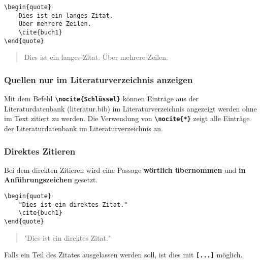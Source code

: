 \begin{minipage}[c]{0.48\textwidth}
    \begin{lstlisting}[language={[LaTeX]TeX}]
\begin{quote}
    Dies ist ein langes Zitat. 
    Uber mehrere Zeilen.
    \cite{buch1}
\end{quote}
    \end{lstlisting}
\end{minipage}
\hfill
\begin{minipage}[c]{0.48\textwidth}
    \begin{quote}
        Dies ist ein langes Zitat.
        Über mehrere Zeilen.
        \cite{buch1}
    \end{quote}
\end{minipage}

\subsubsection{Quellen nur im Literaturverzeichnis anzeigen}
Mit dem Befehl \textbf{\texttt{\textbackslash nocite\{Schlüssel\}}} können Einträge aus der Literaturdatenbank (literatur.bib) im Literaturverzeichnis angezeigt werden ohne im Text zitiert zu werden.
Die Verwendung von \textbf{\texttt{\textbackslash nocite\{*\}}} zeigt alle Einträge der Literaturdatenbank im Literaturverzeichnis an.

\subsubsection{Direktes Zitieren}
Bei dem direkten Zitieren wird eine Passage \textbf{wörtlich übernommen} und \textbf{in Anführungszeichen} gesetzt.

\begin{minipage}[c]{0.48\textwidth}
    \begin{lstlisting}[language={[LaTeX]TeX}]
\begin{quote}
    "Dies ist ein direktes Zitat."
    \cite{buch1}
\end{quote}
    \end{lstlisting}
\end{minipage}
\hfill
\begin{minipage}[c]{0.48\textwidth}
    \begin{quote}
        "Dies ist ein direktes Zitat."
        \cite{buch1}
    \end{quote}
\end{minipage}

Falls ein Teil des Zitates ausgelassen werden soll, ist dies mit \textbf{\texttt{[...]}} möglich.

